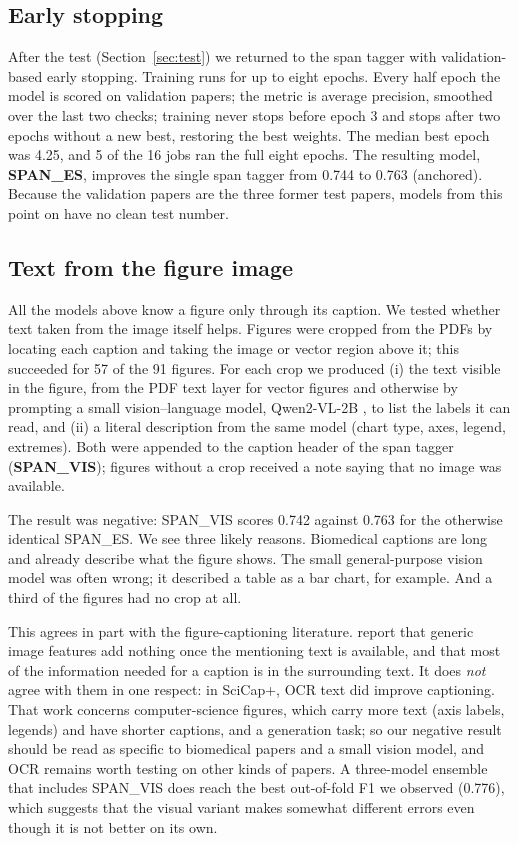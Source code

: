 \subsection{Early stopping}
After the test (Section~\ref{sec:test}) we returned to the span tagger with validation-based early stopping.
Training runs for up to eight epochs. Every half epoch the model is scored on validation papers; the metric is
average precision, smoothed over the last two checks; training never stops before epoch 3 and stops after two
epochs without a new best, restoring the best weights. The median best epoch was 4.25, and 5 of the 16 jobs ran
the full eight epochs. The resulting model, \textbf{SPAN\_ES}, improves the single span tagger from 0.744 to
0.763 (anchored). Because the validation papers are the three former test papers, models from this point on
have no clean test number.

\subsection{Text from the figure image}
\label{sec:vis}
All the models above know a figure only through its caption. We tested whether text taken from the image
itself helps. Figures were cropped from the PDFs by locating each caption and taking the image or vector
region above it; this succeeded for 57 of the 91 figures. For each crop we produced (i) the text visible in
the figure, from the PDF text layer for vector figures and otherwise by prompting a small vision--language
model, Qwen2-VL-2B \citep{wang2024qwen2vl}, to list the labels it can read, and (ii) a literal description
from the same model (chart type, axes, legend, extremes). Both were appended to the caption header of the
span tagger (\textbf{SPAN\_VIS}); figures without a crop received a note saying that no image was available.

The result was negative: SPAN\_VIS scores 0.742 against 0.763 for the otherwise identical SPAN\_ES. We see
three likely reasons. Biomedical captions are long and already describe what the figure shows. The small
general-purpose vision model was often wrong; it described a table as a bar chart, for example. And a third of
the figures had no crop at all.

This agrees in part with the figure-captioning literature. \citet{yang2023scicapplus} report that generic
image features add nothing once the mentioning text is available, and \citet{huang2023summaries} that most of
the information needed for a caption is in the surrounding text. It does \emph{not} agree with them in one
respect: in SciCap+, OCR text did improve captioning. That work concerns computer-science figures, which carry
more text (axis labels, legends) and have shorter captions, and a generation task; so our negative result
should be read as specific to biomedical papers and a small vision model, and OCR remains worth testing on
other kinds of papers. A three-model ensemble that includes SPAN\_VIS does reach the best out-of-fold F1 we
observed (0.776), which suggests that the visual variant makes somewhat different errors even though it is not
better on its own.


